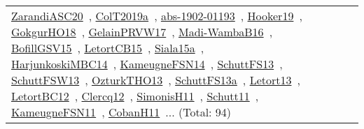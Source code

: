 {\begin{longtable}{lp{3cm}>{\raggedright\arraybackslash}p{6cm}>{\raggedright\arraybackslash}p{6cm}>{\raggedright\arraybackslash}p{8cm}}
\href{../works/ZarandiASC20.pdf}{ZarandiASC20}~\cite{ZarandiASC20}, \href{../works/ColT2019a.pdf}{ColT2019a}~\cite{ColT2019a}, \href{../works/abs-1902-01193.pdf}{abs-1902-01193}~\cite{abs-1902-01193}, \href{../works/Hooker19.pdf}{Hooker19}~\cite{Hooker19}, \href{../works/GokgurHO18.pdf}{GokgurHO18}~\cite{GokgurHO18}, \href{../works/GelainPRVW17.pdf}{GelainPRVW17}~\cite{GelainPRVW17}, \href{../works/Madi-WambaB16.pdf}{Madi-WambaB16}~\cite{Madi-WambaB16}, \href{../works/BofillGSV15.pdf}{BofillGSV15}~\cite{BofillGSV15}, \href{../works/LetortCB15.pdf}{LetortCB15}~\cite{LetortCB15}, \href{../works/Siala15a.pdf}{Siala15a}~\cite{Siala15a}, \href{../works/HarjunkoskiMBC14.pdf}{HarjunkoskiMBC14}~\cite{HarjunkoskiMBC14}, \href{../works/KameugneFSN14.pdf}{KameugneFSN14}~\cite{KameugneFSN14}, \href{../works/SchuttFS13.pdf}{SchuttFS13}~\cite{SchuttFS13}, \href{../works/SchuttFSW13.pdf}{SchuttFSW13}~\cite{SchuttFSW13}, \href{../works/OzturkTHO13.pdf}{OzturkTHO13}~\cite{OzturkTHO13}, \href{../works/SchuttFS13a.pdf}{SchuttFS13a}~\cite{SchuttFS13a}, \href{../works/Letort13.pdf}{Letort13}~\cite{Letort13}, \href{../works/LetortBC12.pdf}{LetortBC12}~\cite{LetortBC12}, \href{../works/Clercq12.pdf}{Clercq12}~\cite{Clercq12}, \href{../works/SimonisH11.pdf}{SimonisH11}~\cite{SimonisH11}, \href{../works/Schutt11.pdf}{Schutt11}~\cite{Schutt11}, \href{../works/KameugneFSN11.pdf}{KameugneFSN11}~\cite{KameugneFSN11}, \href{../works/CobanH11.pdf}{CobanH11}~\cite{CobanH11}... (Total: 94)\\

\end{longtable}}
